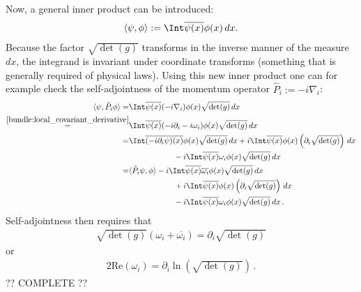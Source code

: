     Now, a general inner product can be introduced:
    \begin{gather}
        \langle\psi,\phi\rangle := \Int\overline{\psi(x)}\phi(x)\,dx.
    \end{gather}
    Because the factor $\sqrt{\det(g)}$ transforms in the inverse manner of the measure $dx$, the integrand is invariant under coordinate transforms (something that is generally required of physical laws). Using this new inner product one can for example check the self-adjointness of the momentum operator $\hat{P}_i := -i\nabla_i$:
    \begin{align*}
        \langle\psi,\hat{P}_i\phi\rangle = &\Int\overline{\psi(x)}(-i\nabla_i)\phi(x)\sqrt{\det(g)}\,dx\\
        \overset{\cref{bundle:local_covariant_derivative}}{=} &\Int\overline{\psi(x)}(-i\partial_i - i\omega_i)\phi(x)\sqrt{\det(g)}\,dx\\
        = &\Int\overline{(-i\partial_i\psi)(x)}\phi(x)\sqrt{\det(g)}\,dx+i\Int\overline{\psi(x)}\phi(x)\left(\partial_i\sqrt{\det(g)}\right)\,dx\\
            &\hspace{2cm} -i\Int\overline{\psi(x)}\omega_i\phi(x)\sqrt{\det(g)}\,dx\\
        = &\langle\hat{P}_i\psi,\phi\rangle -i\Int\overline{\psi(x)}\overline{\omega_i}\phi(x)\sqrt{\det(g)}\,dx\\
            &\hspace{2cm} + i\Int\overline{\psi(x)}\phi(x)\left(\partial_i\sqrt{\det(g)}\right)\,dx\\
            &\hspace{2cm} -i\Int\overline{\psi(x)}\omega_i\phi(x)\sqrt{\det(g)}\,dx\,.
    \end{align*}
    Self-adjointness then requires that
    \begin{gather}
        \sqrt{\det(g)}(\omega_i + \overline{\omega_i}) = \partial_i\sqrt{\det(g)}
    \end{gather}
    or
    \begin{gather}
        2\mathrm{Re}(\omega_i) = \partial_i\ln\left(\sqrt{\det(g)}\right)\,.
    \end{gather}
    ?? COMPLETE ??

\section{}

